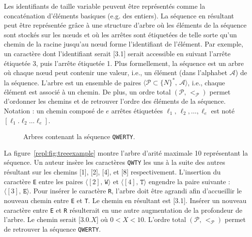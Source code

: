 Les identifiants de taille variable peuvent être représentés comme la
concaténation d'éléments basiques (e.g. des entiers). La séquence en résultant
peut être représentée grâce à une structure d'arbre où les éléments de la
séquence sont stockés sur les nœuds et où les arrêtes sont étiquetées de telle
sorte qu'un chemin de la racine jusqu'au nœud forme l'identifiant de
l'élément. Par exemple, un caractère dont l'identifiant serait [3.1] serait
accessible en suivant l'arrête étiquetée 3, puis l'arrête étiquetée 1. Plus
formellement, la séquence est un arbre où chaque nœud peut contenir une valeur,
i.e., un élément (dans l'alphabet $\mathcal{A}$) de la séquence. L'arbre est un
ensemble de paires $\langle \mathcal{P}\subset \{N\}^*,\, \mathcal{A} \rangle$,
i.e., chaque élément est associé à un chemin. De plus, un ordre total
$(\mathcal{P},\, <_\mathcal{P})$ permet d'ordonner les chemins et de retrouver
l'ordre des éléments de la séquence. Notation : un chemin composé de $e$ arrêtes
étiquetées $\ell_1,\,\ell_2,\ldots,\ell_e$ est noté
$[\ell_1.\ell_2\ldots\ell_e]$.

\begin{figure}
  \centering
  \hspace{20pt}
  \caption[Arbres contenant une séquence répliquée]
  {Arbres contenant la séquence \texttt{QWERTY}.}
\end{figure}

La figure~\ref{repl:fig:treeexample} montre l'arbre d'arité maximale 10
représentant la séquence. Un auteur insère les caractères \texttt{QWTY} les uns
à la suite des autres résultant sur les chemins [1], [2], [4], et [8]
respectivement. L'insertion du caractère \texttt{E} entre les paires
$\langle [2],\, \texttt{W} \rangle$ et $\langle [4],\, \texttt{T} \rangle$
engendre la paire suivante : $\langle [3],\, \texttt{E} \rangle$. Pour insérer
le caractère \texttt{R}, l'arbre doit être agrandi afin d'accueillir le nouveau
chemin entre \texttt{E} et \texttt{T}. Le chemin en résultant est [3.1]. Insérer
un nouveau caractère entre \texttt{E} et \texttt{R} résulterait en une autre
augmentation de la profondeur de l'arbre. Le chemin serait [3.0.$X$] où
$0<X<10$. L'ordre total $(\mathcal{P},\, <_\mathcal{P})$ permet de retrouver la
séquence \texttt{QWERTY}.


